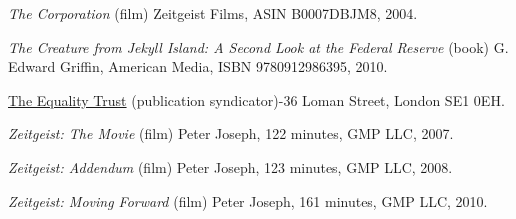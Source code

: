 \item
{\it The Corporation} (film)\crlf
Zeitgeist Films, ASIN B0007DBJM8, 2004.

\item
{\it The Creature from Jekyll Island: A Second Look at the Federal Reserve} (book)\crlf
G. Edward Griffin, American Media, ISBN 9780912986395, 2010.

\item
\href{http://www.equalitytrust.org.uk/resources/publications}{The Equality Trust} (publication syndicator)-36 Loman Street, London SE1 0EH.

\item
{\it Zeitgeist: The Movie} (film)\crlf
Peter Joseph, 122 minutes, GMP LLC, 2007.

\item
{\it Zeitgeist: Addendum} (film)\crlf
Peter Joseph, 123 minutes, GMP LLC, 2008.

\item
{\it Zeitgeist: Moving Forward} (film)\crlf
Peter Joseph, 161 minutes, GMP LLC, 2010.
\stopitemize

